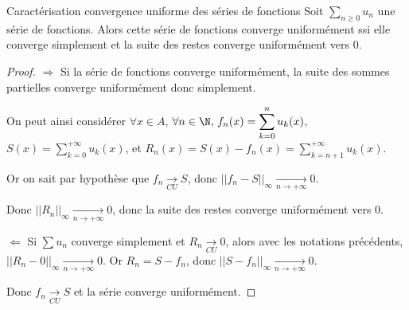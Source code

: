 \begin{propositionnt}{Caractérisation convergence uniforme des séries de fonctions}
    Soit $\displaystyle \sum_{n \geqslant 0} u_n$ une série de fonctions. Alors 
    cette série de fonctions converge uniformément ssi elle converge simplement et
    la suite des restes converge uniformément vers $0$. 
\end{propositionnt}


\begin{proof}
    $\Rightarrow$ Si la série de fonctions converge uniformément, la suite des sommes partielles converge 
    uniformément donc simplement. 

    On peut ainsi considérer $\forall x \in A$, $\forall n \in \N, \, f_n(x) = \displaystyle \sum_{k = 0}^n u_k(x)$, 
    $\displaystyle S(x) = \sum_{k = 0}^{ + \infty } u_k(x)$, et $\displaystyle R_n(x) = S(x) - f_n(x) = \sum_{k = n + 1}^{ + \infty } u_k(x)$.

    Or on sait par hypothèse que $f_n \xrightarrow[CU]{} S$, donc $||f_n - S||_{\infty} \xrightarrow[n\to +\infty]{} 0$.

    Donc $\displaystyle || R_n ||_{\infty} \xrightarrow[n\to +\infty]{} 0$, donc la suite des restes converge uniformément vers $0$.


    \lvspace   $\Leftarrow$ Si $\displaystyle \sum u_n$ converge simplement et $R_n \xrightarrow[CU]{} 0$, alors avec les notations
    précédents, $||R_n - 0 ||_{\infty} \xrightarrow[n\to +\infty]{} 0$. Or $R_n = S - f_n$, donc $|| S - f_n ||_{\infty} \xrightarrow[n\to +\infty]{} 0$.

    Donc $f_n \xrightarrow[CU]{} S$ et la série converge uniformément.
\end{proof}

